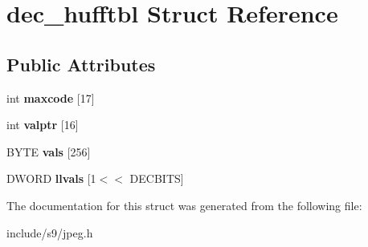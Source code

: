 \hypertarget{structdec__hufftbl}{\section{dec\-\_\-hufftbl Struct Reference}
\label{structdec__hufftbl}
}
\subsection*{Public Attributes}
\begin{DoxyCompactItemize}
\item 
\hypertarget{structdec__hufftbl_a8b500876289dda1731ca4360ed8dc4e6}{int {\bfseries maxcode} \mbox{[}17\mbox{]}}\label{structdec__hufftbl_a8b500876289dda1731ca4360ed8dc4e6}

\item 
\hypertarget{structdec__hufftbl_a4011f65e72d693639c5a353c386a7519}{int {\bfseries valptr} \mbox{[}16\mbox{]}}\label{structdec__hufftbl_a4011f65e72d693639c5a353c386a7519}

\item 
\hypertarget{structdec__hufftbl_a91e35217d39149d2f98b896f65d0bc33}{B\-Y\-T\-E {\bfseries vals} \mbox{[}256\mbox{]}}\label{structdec__hufftbl_a91e35217d39149d2f98b896f65d0bc33}

\item 
\hypertarget{structdec__hufftbl_a286111323bdb40b2032f7c441f9c311d}{D\-W\-O\-R\-D {\bfseries llvals} \mbox{[}1$<$$<$ D\-E\-C\-B\-I\-T\-S\mbox{]}}\label{structdec__hufftbl_a286111323bdb40b2032f7c441f9c311d}

\end{DoxyCompactItemize}


The documentation for this struct was generated from the following file\-:\begin{DoxyCompactItemize}
\item 
include/s9/jpeg.\-h\end{DoxyCompactItemize}

